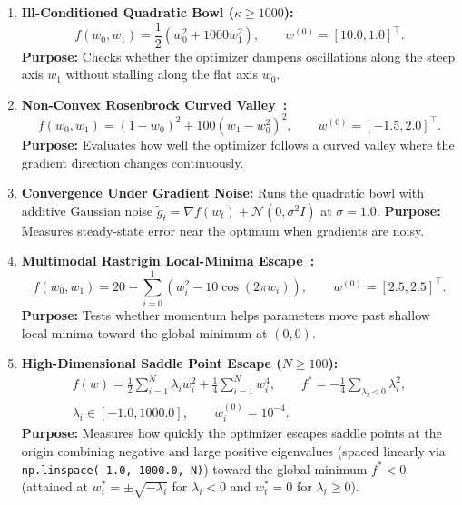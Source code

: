 \documentclass[11pt,a4paper]{article}
\renewcommand{\_}{\origunderscore\allowbreak}
\begin{document}
\begin{enumerate}[label=\textbf{B\arabic*.}, leftmargin=2.4em, itemsep=0.45em]
    \item \textbf{Ill-Conditioned Quadratic Bowl ($\kappa \ge 1000$):}
    \begin{equation}
        f(w_0, w_1) = \frac{1}{2}\left(w_0^2 + 1000w_1^2\right), \qquad w^{(0)} = [10.0, 1.0]^\top.
    \end{equation}
    \textbf{Purpose:} Checks whether the optimizer dampens oscillations along the steep axis $w_1$ without stalling along the flat axis $w_0$.

    \item \textbf{Non-Convex Rosenbrock Curved Valley~\cite{jamil2013survey,rosenbrock1960automatic}:}
    \begin{equation}
        f(w_0, w_1) = (1 - w_0)^2 + 100(w_1 - w_0^2)^2, \qquad w^{(0)} = [-1.5, 2.0]^\top.
    \end{equation}
    \textbf{Purpose:} Evaluates how well the optimizer follows a curved valley where the gradient direction changes continuously.

    \item \textbf{Convergence Under Gradient Noise:} Runs the quadratic bowl with additive Gaussian noise $\tilde{g}_t = \nabla f(w_t) + \mathcal{N}(0, \sigma^2 I)$ at $\sigma = 1.0$. \textbf{Purpose:} Measures steady-state error near the optimum when gradients are noisy.

    \item \textbf{Multimodal Rastrigin Local-Minima Escape~\cite{rastrigin1974systems}:}
    \begin{equation}
        f(w_0, w_1) = 20 + \sum_{i=0}^{1}\left(w_i^2 - 10\cos(2\pi w_i)\right), \qquad w^{(0)} = [2.5, 2.5]^\top.
    \end{equation}
    \textbf{Purpose:} Tests whether momentum helps parameters move past shallow local minima toward the global minimum at $(0, 0)$.

    \item \textbf{High-Dimensional Saddle Point Escape ($N \ge 100$):}
    \begin{equation}
        \begin{gathered}
            f(w) = \frac{1}{2}\sum_{i=1}^{N}\lambda_i w_i^2 + \frac{1}{4}\sum_{i=1}^{N} w_i^4, \qquad f^* = -\frac{1}{4}\sum_{\lambda_i < 0}\lambda_i^2, \\
            \lambda_i \in [-1.0, 1000.0], \qquad w_i^{(0)} = 10^{-4}.
        \end{gathered}
    \end{equation}
    \textbf{Purpose:} Measures how quickly the optimizer escapes saddle points at the origin combining negative and large positive eigenvalues (spaced linearly via \texttt{np.linspace(-1.0, 1000.0, N)}) toward the global minimum $f^* < 0$ (attained at $w_i^* = \pm\sqrt{-\lambda_i}$ for $\lambda_i < 0$ and $w_i^* = 0$ for $\lambda_i \ge 0$).
\end{enumerate}
\end{document}
